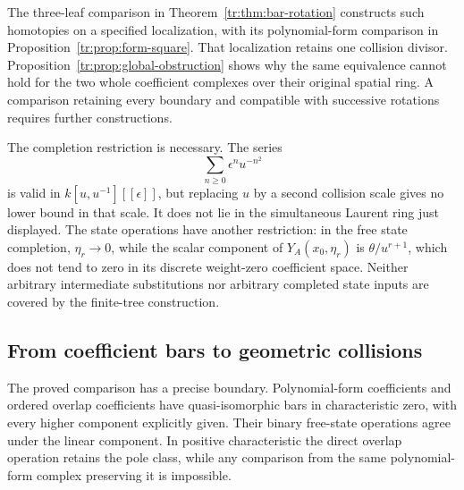 The three-leaf comparison in Theorem~\ref{tr:thm:bar-rotation} constructs
such homotopies on a specified localization, with its polynomial-form
comparison in Proposition~\ref{tr:prop:form-square}.  That localization
retains one collision divisor.  Proposition~\ref{tr:prop:global-obstruction}
shows why the same equivalence cannot hold for the two whole
coefficient complexes over their original spatial ring.  A comparison
retaining every boundary and compatible with successive rotations
requires further constructions.

The completion restriction is necessary.  The series
\[
 \sum_{n\ge0}\epsilon^n u^{-n^2}
\]
is valid in \(k[u,u^{-1}][[\epsilon]]\), but replacing \(u\)
by a second collision scale gives no lower bound in that scale.
It does not lie in the simultaneous Laurent ring just displayed.
The state operations have another restriction: in the free state
completion, \(\eta_r\to0\), while the scalar component of
\(Y_A(x_0,\eta_r)\) is \(\theta/u^{r+1}\), which does not
tend to zero in its discrete weight-zero coefficient space.
Neither arbitrary intermediate substitutions nor arbitrary completed
state inputs are covered by the finite-tree construction.

\subsection{From coefficient bars to geometric collisions}
\label{sb:sec:state-native-boundary}

The proved comparison has a precise boundary.  Polynomial-form
coefficients and ordered overlap coefficients have quasi-isomorphic
bars in characteristic zero, with every higher component explicitly
given.  Their binary free-state operations agree under the linear
component.  In positive characteristic the direct overlap operation
retains the pole class, while any comparison from the same polynomial-form
complex preserving it is impossible.

